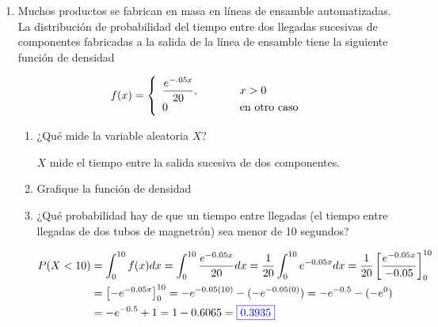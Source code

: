 \documentclass[12pt]{report}
\newcommand{\linejump}{\hfill \break}
\begin{document}
  \begin{enumerate}
    \item Muchos productos se fabrican en masa en líneas de ensamble automatizadas. La distribución de probabilidad del tiempo entre dos llegadas sucesivas de componentes fabricadas a la salida de la línea de ensamble tiene la siguiente función de densidad

    \[
      f(x) = \left\{
      \begin{array}{ll}
          \dfrac{e^{-.05x}}{20}, & \hspace*{1cm} x > 0 \\
          0 & \hspace*{1cm} \text{en otro caso}
      \end{array}
      \right.
    \]

  \linejump
  \begin{enumerate}[label=\alph*.]
    \item ¿Qué mide la variable aleatoria $X$?

    $X$ mide el tiempo entre la salida sucesiva de dos componentes.

    \newpage
    \item Grafique la función de densidad
    
    \begin{center}
    \end{center}
    
    \item ¿Qué probabilidad hay de que un tiempo entre llegadas (el tiempo entre llegadas de dos tubos de magnetrón) sea menor de 10 segundos?
    
    \begin{align*}
      P(X < 10) &= \int_0^{10} f(x)dx = \int_0^{10} \frac{e^{-0.05x}}{20} dx = \frac{1}{20} \int_0^{10} e^{-0.05x} dx = \frac{1}{20} \left[ \frac{e^{-0.05x}}{-0.05} \right]_0^{10} \\
      &= \left[ -e^{-0.05x} \right]_0^{10} = -e^{-0.05(10)} - (-e^{-0.05(0)}) = -e^{-0.5} - (-e^0) \\
      &= -e^{-0.5} + 1 = 1 - 0.6065 = {\color{blue}\boxed{0.3935}}
    \end{align*}


\end{enumerate}
\end{enumerate}
\end{document}

